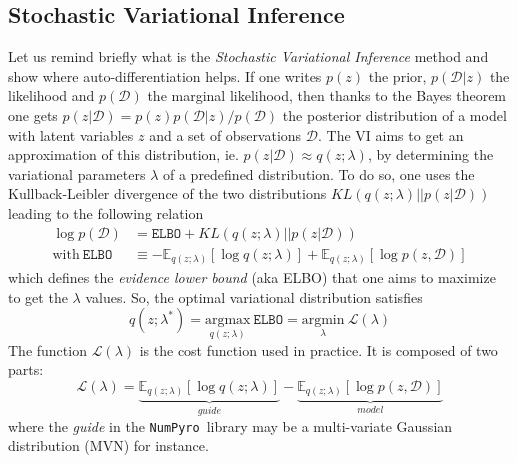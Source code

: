 \documentclass[final,5p,times,twocolumn,authoryear]{elsarticle}
\newcommand{\numpyro}{\texttt{NumPyro}}
\begin{document}
\subsection{Stochastic Variational Inference}
\label{sec-SVI}
%
Let us remind briefly what is the \textit{Stochastic Variational Inference} method \citep{2012arXiv1206.7051H, 2017arXiv171105597Z} and show where auto-differentiation helps. If one  writes $p(z)$ the prior, $p(\mathcal{D}|z)$ the likelihood and $p(\mathcal{D})$ the marginal likelihood, then thanks to the  Bayes theorem one gets $p(z|\mathcal{D})=p(z)p(\mathcal{D}|z)/p(\mathcal{D})$ the posterior distribution of a model with latent variables $z$ and a set of observations $\mathcal{D}$. The VI aims to get an approximation of this distribution, ie. $p(z|\mathcal{D}) \approx q(z;\lambda)$, by determining the variational parameters $\lambda$ of a predefined distribution. To do so, one uses the Kullback-Leibler divergence of the two distributions $KL(q(z;\lambda)||p(z|\mathcal{D}))$ leading to the following relation
\begin{align}
\log p(\mathcal{D}) &= \mathtt{ELBO} +  KL(q(z;\lambda)||p(z|\mathcal{D})) \label{eq-ELBO} \\
\mathrm{with} \ \mathtt{ELBO} &\equiv -\mathbb{E}_{q(z;\lambda)}\left[ \log q(z;\lambda)\right] + \mathbb{E}_{q(z;\lambda)}\left[ \log p(z,\mathcal{D}) \right] 
\end{align}
which defines the \textit{evidence lower bound} (aka ELBO) that one aims to maximize to get the $\lambda$ values. So, the optimal variational distribution satisfies
\begin{equation}
q(z;\lambda^\ast) = \underset{q(z;\lambda)}{\mathrm{argmax}}\  \mathtt{ELBO} = 
\underset{\lambda}{\mathrm{argmin}}\ \mathcal{L}(\lambda)
\end{equation}
The function $\mathcal{L}(\lambda)$ is the cost function used in practice. It is composed of two parts:
\begin{equation}
\mathcal{L}(\lambda) = \underbrace{\mathbb{E}_{q(z;\lambda)}\left[ \log q(z;\lambda)\right]}_{guide} - \underbrace{\mathbb{E}_{q(z;\lambda)}\left[ \log p(z,\mathcal{D}) \right]}_{model}
\label{eq-loss-svi-1}
\end{equation}
where the \textit{guide} in the \numpyro\ library may be a multi-variate Gaussian distribution (MVN) for instance.
\end{document}
